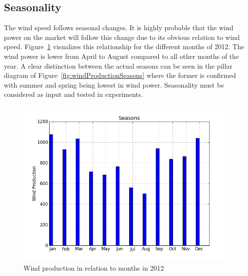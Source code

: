 \subsection{Seasonality}
\label{sec:windProdSeasonality}
The wind speed follows seasonal changes. It is highly probable that the wind power on the market will follow this change due to its obvious relation to wind speed. Figure~\ref{fig:windProductionMonths} visualizes this relationship for the different months of 2012. The wind power is lower from April to August compared to all other months of the year. A clear distinction between the actual seasons can be seen in the pillar diagram of Figure~\ref{fig:windProductionSeasons} where the former is confirmed with summer and spring being lowest in wind power. Seasonality must be considered as input and tested in experiments.

\begin{figure}[H]
\centering
\includegraphics[width=0.99\linewidth,natwidth=898,natheight=587]{billeder/Seasons/windProductionMonths.png}
\caption{Wind production in relation to months in 2012}
\label{fig:windProductionMonths}
\end{figure}

